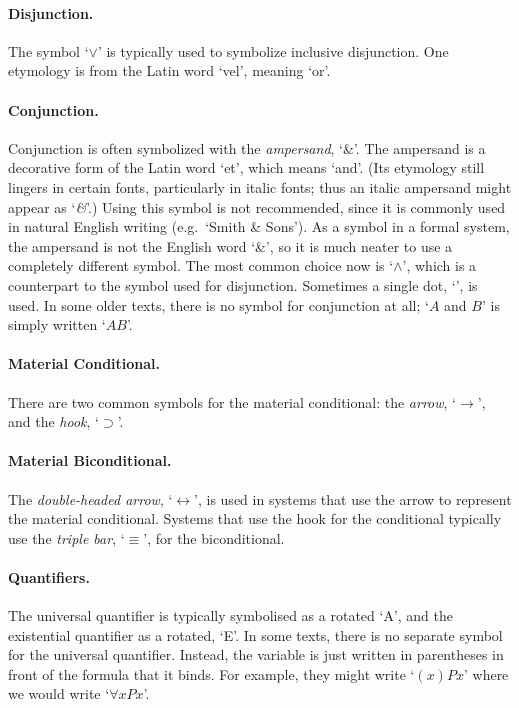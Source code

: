 \paragraph{Disjunction.} The symbol `$\vee$' is typically used to symbolize inclusive disjunction. One etymology is from the Latin word `vel', meaning `or'.%

\paragraph{Conjunction.}
Conjunction is often symbolized with the \emph{ampersand}, `{\&}'. The ampersand is a decorative form of the Latin word `et', which means `and'.  (Its etymology still lingers in certain fonts, particularly in italic fonts; thus an italic ampersand might appear as `\emph{\&}'.) Using this symbol is not recommended, since it is commonly used in natural English writing (e.g.\ `Smith \& Sons'). As a symbol in a formal system, the ampersand is not the English word `\&', so it is much neater to use a completely different symbol. The most common choice now is `$\wedge$', which is a counterpart to the symbol used for disjunction. Sometimes a single dot, `{\scriptsize\textbullet}', is used. In some older texts, there is no symbol for conjunction at all; `$A$ and $B$' is simply written `$AB$'.

\paragraph{Material Conditional.} There are two common symbols for the material conditional: the \emph{arrow}, `$\rightarrow$', and the \emph{hook}, `$\supset$'.

\paragraph{Material Biconditional.} The \emph{double-headed arrow}, `$\leftrightarrow$', is used in systems that use the arrow to represent the material conditional. Systems that use the hook for the conditional typically use the \emph{triple bar}, `$\equiv$', for the biconditional.

\paragraph{Quantifiers.} The universal quantifier is typically symbolised as a rotated `A', and the existential quantifier as a rotated, `E'. In some texts, there is no separate symbol for the universal quantifier. Instead, the variable is just written in parentheses in front of the formula that it binds. For example, they might write `$(x)Px$' where we would write `$\forall x Px$'.

